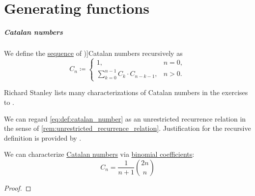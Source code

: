 \chapter{Generating functions}\label{sec:generating_functions}


\paragraph{Catalan numbers}

\begin{definition}\label{def:catalan_number}
  We define the \hyperref[def:sequence]{sequence} of \term[ru=число Каталана (\cite[\S 5.7.4]{Новиков2013ДискретнаяМатематика})]{Catalan numbers} recursively as
  \begin{equation}\label{eq:def:catalan_number}
    C_n \coloneqq \begin{cases}
      1,                                    &n = 0, \\
      \sum_{k=0}^{n-1} C_k \cdot C_{n-k-1}, &n > 0.
    \end{cases}
  \end{equation}
\end{definition}
\begin{comments}
  \item Richard Stanley lists many characterizations of Catalan numbers in the exercises to \cite[ch. 6]{Stanley2023EnumerativeCombinatoricsVol2}.

  \item We can regard \eqref{eq:def:catalan_number} as an unrestricted recurrence relation in the sense of \cref{rem:unrestricted_recurrence_relation}. Justification for the recursive definition is provided by .
\end{comments}

\begin{proposition}\label{thm:catalan_number_via_binomial_coefficients}
  We can characterize \hyperref[def:catalan_number]{Catalan numbers} via \hyperref[def:binomial_coefficient]{binomial coefficients}:
  \begin{equation}\label{eq:thm:catalan_number_via_binomial_coefficients}
    C_n = \frac 1 {n + 1} \binom {2n} n
  \end{equation}
\end{proposition}
\begin{proof}
\end{proof}

